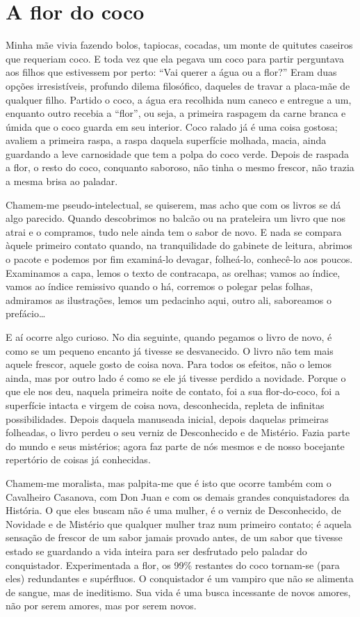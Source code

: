 \chapter{A flor do coco}

Minha mãe vivia fazendo bolos, tapiocas, cocadas, um monte de quitutes
caseiros que requeriam coco. E toda vez que ela pegava um coco para
partir perguntava aos filhos que estivessem por perto: “Vai querer a
água ou a flor?” Eram duas opções irresistíveis, profundo dilema
filosófico, daqueles de travar a placa-mãe de qualquer filho. Partido
o coco, a água era recolhida num caneco e entregue a um, enquanto
outro recebia a “flor”, ou seja, a primeira raspagem da carne branca
e úmida que o coco guarda em seu interior. Coco ralado já é uma coisa
gostosa; avaliem a primeira raspa, a raspa daquela superfície
molhada, macia, ainda guardando a leve carnosidade que tem a polpa do
coco verde. Depois de raspada a flor, o resto do coco, conquanto
saboroso, não tinha o mesmo frescor, não trazia a mesma brisa ao
paladar.

Chamem-me pseudo-intelectual, se quiserem, mas acho que com os livros
se dá algo parecido. Quando descobrimos no balcão ou na prateleira um
livro que nos atrai e o compramos, tudo nele ainda tem o sabor de
novo. E nada se compara àquele primeiro contato quando, na
tranquilidade do gabinete de leitura, abrimos o pacote e podemos por
fim examiná-lo devagar, folheá-lo, conhecê-lo aos poucos. Examinamos
a capa, lemos o texto de contracapa, as orelhas; vamos ao índice,
vamos ao índice remissivo quando o há, corremos o polegar pelas
folhas, admiramos as ilustrações, lemos um pedacinho aqui, outro ali,
saboreamos o prefácio…

E aí ocorre algo curioso. No dia seguinte, quando pegamos o livro de
novo, é como se um pequeno encanto já tivesse se desvanecido. O livro
não tem mais aquele frescor, aquele gosto de coisa nova. Para todos
os efeitos, não o lemos ainda, mas por outro lado é como se ele já
tivesse perdido a novidade. Porque o que ele nos deu, naquela
primeira noite de contato, foi a sua flor-do-coco, foi a superfície
intacta e virgem de coisa nova, desconhecida, repleta de infinitas
possibilidades. Depois daquela manuseada inicial, depois daquelas
primeiras folheadas, o livro perdeu o seu verniz de Desconhecido e de
Mistério. Fazia parte do mundo e seus mistérios; agora faz parte de
nós mesmos e de nosso bocejante repertório de coisas já conhecidas.

Chamem-me moralista, mas palpita-me que é isto que ocorre também com o
Cavalheiro Casanova, com Don Juan e com os demais grandes
conquistadores da História. O que eles buscam não é uma mulher, é o
verniz de Desconhecido, de Novidade e de Mistério que qualquer mulher
traz num primeiro contato; é aquela sensação de frescor de um sabor
jamais provado antes, de um sabor que tivesse estado se guardando a
vida inteira para ser desfrutado pelo paladar do conquistador.
Experimentada a flor, os 99\% restantes do coco tornam-se (para eles)
redundantes e supérfluos. O conquistador é um vampiro que não se
alimenta de sangue, mas de ineditismo. Sua vida é uma busca
incessante de novos amores, não por serem amores, mas por serem
novos.

